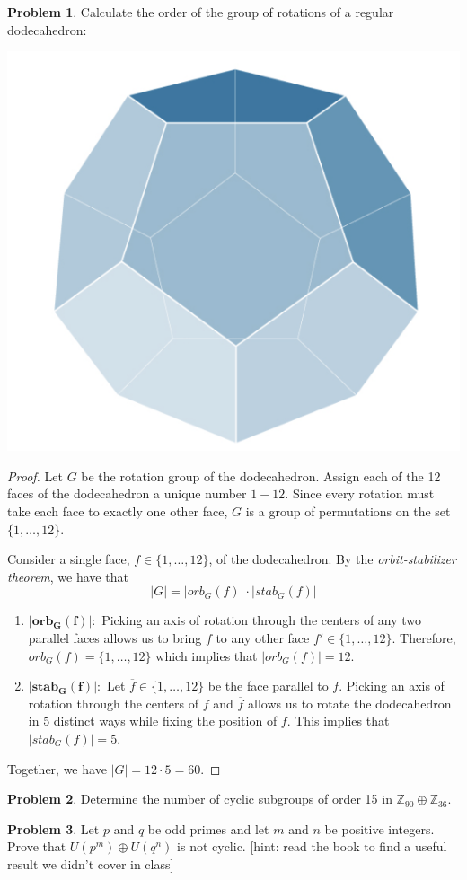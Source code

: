 \documentclass[12pt,reqno]{article}
\theoremstyle{plain}
\theoremstyle{definition}
\newtheorem{problem}{Problem}
\begin{document}
\begin{problem} 
    Calculate the order of the group of rotations of a regular dodecahedron:
    \begin{center}
        \includegraphics[height = 1.6 in]{Screenshot 2023-03-03 at 1.12.39 PM.png}
    \end{center}
\end{problem}

\begin{proof}
    Let \(G\) be the rotation group of the dodecahedron. Assign each of the 12 faces of the dodecahedron a unique number \(1-12\).
    Since every rotation must take each face to exactly one other face, \(G\) is a group of permutations
    on the set \(\{1,\ldots,12\}\). 
    
    Consider a single face, \(f\in\{1,\ldots,12\}\), of the dodecahedron.
    By the \emph{orbit-stabilizer theorem}, we have that 
    \[|G|=|orb_G(f)|\cdot |stab_G(f)|\]
    \begin{enumerate}
        \item \(\mathbf{|orb_G(f)|}:\) Picking an axis of rotation through the centers of any two
        parallel faces allows us to bring \(f\) to any other face \(f'\in\{1,\ldots,12\}\).
        Therefore, \(orb_G(f)=\{1,\ldots,12\}\) which implies that \(|orb_G(f)|=12\).
        \item \(\mathbf{|stab_G(f)|}:\) Let \(\overline{f}\in \{1,\ldots,12\}\) be the face parallel to \(f\). 
        Picking an axis of rotation through the centers of \(f\) and \(\overline{f}\) allows
        us to rotate the dodecahedron in \(5\) distinct ways while fixing the position of \(f\). 
        This implies that \(|stab_G(f)|=5\).
    \end{enumerate}
    Together, we have \(|G|=12\cdot 5=60\).
\end{proof}

\newpage
    

\begin{problem} 
    Determine the number of cyclic subgroups of order 15 in $\mathbb{Z}_{90} \oplus \mathbb{Z}_{36}$.
\end{problem}

\newpage
    

\begin{problem} 
    Let $p$ and $q$ be odd primes and let $m$ and $n$ be positive integers. Prove that $U(p^m) \oplus U(q^n)$ is not cyclic. [hint: read the book to find a useful result we didn't cover in class]
\end{problem}
\end{document}
